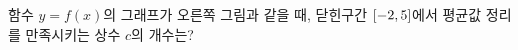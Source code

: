 \noindent\begin{minipage}[t]{0.58\linewidth}\vspace{0pt}\raggedright 함수 $y=f(x)$의 그래프가 오른쪽 그림과 같을 때, 닫힌구간 $[-2{,}\mkern3mu\mathopen{}5]$에서 평균값 정리를 만족시키는 상수 $c$의 개수는?\end{minipage}\hfill\begin{minipage}[t]{0.4\linewidth}\vspace{0pt}\centering \resizebox{\ifdim\width>\linewidth\linewidth\else\width\fi}{!}{}\end{minipage}\par
{}
